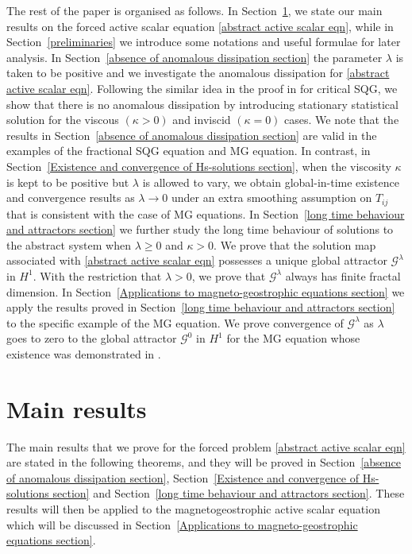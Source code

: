 \documentclass[reqno]{amsart}%
\theoremstyle{definition}
\theoremstyle{remark}
\numberwithin{equation}{section}
\newcommand{\1}{\mathbf{1}}
\newcommand{\A}{\mathcal{G}^{0}}
\newcommand{\Gg}{\mathcal{G}^{\lambda}}
\numberwithin{equation}{section}
\numberwithin{theorem}{section}
\numberwithin{figure}{section}
\begin{document}
The rest of the paper is organised as follows. In Section~\ref{main results}, we state our main results on the forced active scalar equation \eqref{abstract active scalar eqn}, while in Section~\ref{preliminaries} we introduce some notations and useful formulae for later analysis. In Section~\ref{absence of anomalous dissipation section} the parameter $\lambda$ is taken to be positive and we investigate the anomalous dissipation for \eqref{abstract active scalar eqn}. Following the similar idea in the proof in \cite{CTV14b} for critical SQG, we show that there is no anomalous dissipation by introducing stationary statistical solution for the viscous $(\kappa>0)$ and inviscid $(\kappa=0)$ cases. We note that the results in Section~\ref{absence of anomalous dissipation section} are valid in the examples of the fractional SQG equation and MG equation. In contrast, in Section~\ref{Existence and convergence of Hs-solutions section}, when the viscosity $\kappa$ is kept to be positive but $\lambda$ is allowed to vary, we obtain global-in-time existence and convergence results as $\lambda\to0$ under an extra smoothing assumption on $T_{ij}$ that is consistent with the case of MG equations. In Section~\ref{long time behaviour and attractors section} we further study the long time behaviour of solutions to the abstract system when $\lambda\ge0$ and $\kappa>0$. We prove that the solution map associated with \eqref{abstract active scalar eqn} possesses a unique global attractor $\Gg$ in $H^1$. With the restriction that $\lambda>0$, we prove that $\Gg$ always has finite fractal dimension. In Section~\ref{Applications to magneto-geostrophic equations section} we apply the results proved in Section~\ref{long time behaviour and attractors section} to the specific example of the MG equation. We prove convergence of $\Gg$ as $\lambda$ goes to zero to the global attractor $\A$ in $H^1$ for the MG equation whose existence was demonstrated in \cite{FS21}.

\section{Main results}\label{main results}

The main results that we prove for the forced problem \eqref{abstract active scalar eqn} are stated in the following theorems, and they will be proved in Section~\ref{absence of anomalous dissipation section}, Section~\ref{Existence and convergence of Hs-solutions section} and Section~\ref{long time behaviour and attractors section}. These results will then be applied to the magnetogeostrophic active scalar equation which will be discussed in Section~\ref{Applications to magneto-geostrophic equations section}.
\end{document}
